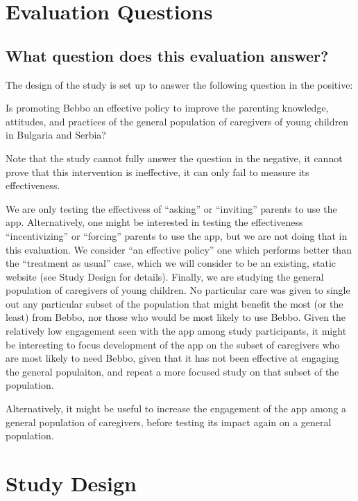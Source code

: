 \documentclass{article}
\begin{document}
\section{Evaluation Questions}

\subsection*{What question does this evaluation answer?}
The design of the study is set up to answer the following question in the positive:

\begin{displayquote}
Is promoting Bebbo an effective policy to improve the parenting knowledge, attitudes, and practices of the general population of caregivers of young children in Bulgaria and Serbia?
\end{displayquote}

\noindent Note that the study cannot fully answer the question in the negative, it cannot prove that this intervention is ineffective, it can only fail to measure its effectiveness.

We are only testing the effectivess of ``asking'' or ``inviting'' parents to use the app. Alternatively, one might be interested in testing the effectiveness ``incentivizing'' or ``forcing'' parents to use the app, but we are not doing that in this evaluation. We consider ``an effective policy'' one which performs better than the ``treatment as usual'' case, which we will consider to be an existing, static website (see Study Design for details). Finally, we are studying the general population of caregivers of young children. No particular care was given to single out any particular subset of the population that might benefit the most (or the least) from Bebbo, nor those who would be most likely to use Bebbo. Given the relatively low engagement seen with the app among study participants, it might be interesting to focus development of the app on the subset of caregivers who are most likely to need Bebbo, given that it has not been effective at engaging the general populaiton, and repeat a more focused study on that subset of the population.

Alternatively, it might be useful to increase the engagement of the app among a general population of caregivers, before testing its impact again on a general population.


\section{Study Design}
\end{document}
